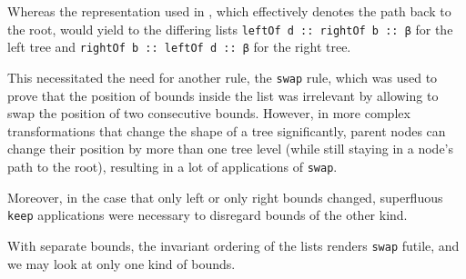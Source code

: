 \documentclass{scrartcl}
\begin{document}
Whereas the representation used in \cite{eha2009}, which
effectively denotes the path back to the root, would yield to the
differing lists \verb/leftOf d :: rightOf b :: β/ for the left tree
and \verb/rightOf b :: leftOf d :: β/ for the right tree.

This necessitated the need for another rule, the \verb/swap/ rule,
which was used to prove that the position of bounds inside the list
was irrelevant by allowing to swap the position of two consecutive
bounds. However, in more complex transformations that change the shape
of a tree significantly, parent nodes can change their position by
more than one tree level (while still staying in a node's path to the
root), resulting in a lot of applications of \verb/swap/.

Moreover, in the case that only left or only right bounds changed,
superfluous \verb/keep/ applications were necessary to disregard
bounds of the other kind.

With separate bounds, the invariant ordering of the lists renders
\verb/swap/ futile, and we may look at only one kind of bounds.




\end{document}
